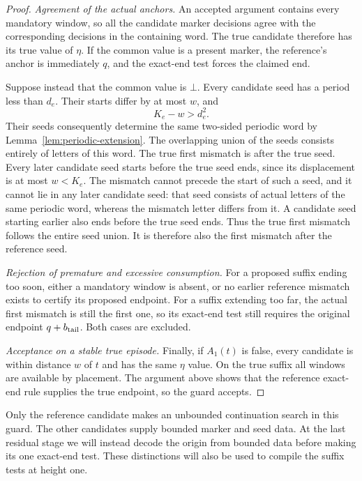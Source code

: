 \begin{proof}
\emph{Agreement of the actual anchors.}
An accepted argument contains every mandatory window, so all the
candidate marker decisions agree with the corresponding decisions in the
containing word.  The true candidate therefore has its true value of
$\eta$.  If the common value is a present marker, the reference's
anchor is immediately $q$, and the exact-end test forces the claimed end.

Suppose instead that the common value is $\bot$.  Every candidate seed
has a period less than $d_e$.  Their starts differ by at most $w$, and
\[
 K_e-w>d_e^2.
\]
Their seeds consequently determine the same two-sided periodic word by
Lemma~\ref{lem:periodic-extension}.  The overlapping union of the seeds
consists entirely of letters of this word.  The true first mismatch is after the true seed. Every later candidate
seed starts before the true seed ends, since its displacement is at most
$w<K_e$. The mismatch cannot precede the start of such a seed, and it
cannot lie in any later candidate seed: that seed consists of actual letters of the same
periodic word, whereas the mismatch letter differs from it. A candidate
seed starting earlier also ends before the true seed ends. Thus the true
first mismatch follows the entire seed union.  It is therefore also the first mismatch after the reference
seed.

\emph{Rejection of premature and excessive consumption.}
For a proposed suffix ending too soon, either a mandatory window is
absent, or no earlier reference mismatch exists to certify its proposed
endpoint.  For a suffix extending too far, the actual first mismatch is
still the first one, so its exact-end test still requires the original
endpoint $q+b_{\rm tail}$.  Both cases are excluded.

\emph{Acceptance on a stable true episode.}
Finally, if $A_1(t)$ is false, every candidate is within distance $w$ of
$t$ and has the same $\eta$ value.  On the true suffix all windows are
available by placement.  The argument above shows that the reference
exact-end rule supplies the true endpoint, so the guard accepts.
\end{proof}

Only the reference candidate makes an unbounded continuation search in
this guard.  The other candidates supply bounded marker and seed data.
At the last residual stage we will instead decode the origin from bounded
data before making its one exact-end test.  These distinctions will also
be used to compile the suffix tests at height one.
